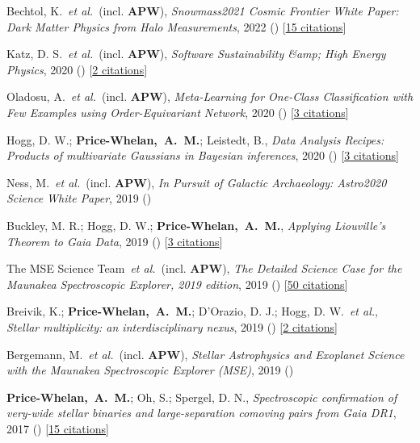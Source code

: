 \item[{\color{deemph}\scriptsize10}]Bechtol, K.~\textit{et al.}~(incl. \textbf{APW}), \textit{Snowmass2021 Cosmic Frontier White Paper: Dark Matter Physics from Halo Measurements}, 2022 () [\href{http://adsabs.harvard.edu/abs/2022arXiv220307354B}{15 citations}]

\item[{\color{deemph}\scriptsize9}]Katz, D. S.~\textit{et al.}~(incl. \textbf{APW}), \textit{Software Sustainability {\&}amp; High Energy Physics}, 2020 () [\href{http://adsabs.harvard.edu/abs/2020arXiv201005102K}{2 citations}]

\item[{\color{deemph}\scriptsize8}]Oladosu, A.~\textit{et al.}~(incl. \textbf{APW}), \textit{Meta-Learning for One-Class Classification with Few Examples using Order-Equivariant Network}, 2020 () [\href{http://adsabs.harvard.edu/abs/2020arXiv200704459O}{3 citations}]

\item[{\color{deemph}\scriptsize7}]Hogg, D. W.; \textbf{Price-Whelan,~A.~M.}; Leistedt, B., \textit{Data Analysis Recipes: Products of multivariate Gaussians in Bayesian inferences}, 2020 () [\href{http://adsabs.harvard.edu/abs/2020arXiv200514199H}{3 citations}]

\item[{\color{deemph}\scriptsize6}]Ness, M.~\textit{et al.}~(incl. \textbf{APW}), \textit{In Pursuit of Galactic Archaeology: Astro2020 Science White Paper}, 2019 ()

\item[{\color{deemph}\scriptsize5}]Buckley, M. R.; Hogg, D. W.; \textbf{Price-Whelan,~A.~M.}, \textit{Applying Liouville's Theorem to Gaia Data}, 2019 () [\href{http://adsabs.harvard.edu/abs/2019arXiv190700987B}{3 citations}]

\item[{\color{deemph}\scriptsize4}]The MSE Science Team~\textit{et al.}~(incl. \textbf{APW}), \textit{The Detailed Science Case for the Maunakea Spectroscopic Explorer, 2019 edition}, 2019 () [\href{http://adsabs.harvard.edu/abs/2019arXiv190404907T}{50 citations}]

\item[{\color{deemph}\scriptsize3}]Breivik, K.; \textbf{Price-Whelan,~A.~M.}; D'Orazio, D. J.; Hogg, D. W.~\textit{et al.}, \textit{Stellar multiplicity: an interdisciplinary nexus}, 2019 () [\href{http://adsabs.harvard.edu/abs/2019arXiv190305094B}{2 citations}]

\item[{\color{deemph}\scriptsize2}]Bergemann, M.~\textit{et al.}~(incl. \textbf{APW}), \textit{Stellar Astrophysics and Exoplanet Science with the Maunakea Spectroscopic Explorer (MSE)}, 2019 ()

\item[{\color{deemph}\scriptsize1}]\textbf{Price-Whelan,~A.~M.}; Oh, S.; Spergel, D. N., \textit{Spectroscopic confirmation of very-wide stellar binaries and large-separation comoving pairs from Gaia DR1}, 2017 () [\href{http://adsabs.harvard.edu/abs/2017arXiv170903532P}{15 citations}]